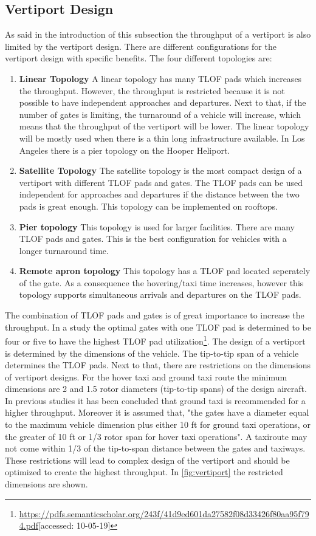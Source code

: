 \subsection{Vertiport Design} \label{subsec:vportDesign}
As said in the introduction of this subsection the throughput of a vertiport is also limited by the vertiport design. There are different configurations for the vertiport design with specific benefits. The four different topologies are:
\begin{enumerate}
    \item \textbf{Linear Topology} A linear topology has many TLOF pads which increases the throughput. However, the throughput is restricted because it is not possible to have independent approaches and departures. Next to that, if the number of gates is limiting, the turnaround of a vehicle will increase, which means that the throughput of the vertiport will be lower. The linear topology will be mostly used when there is a thin long infrastructure available. In Los Angeles there is a pier topology on the Hooper Heliport.
    \item \textbf{Satellite Topology} The satellite topology is the most compact design of a vertiport with different TLOF pads and gates. The TLOF pads can be used independent for approaches and departures if the distance between the two pads is great enough. This topology can be implemented on rooftops.
    \item  \textbf{Pier topology} This topology is used for larger facilities. There are many TLOF pads and gates. This is the best configuration for vehicles with a longer turnaround time.
    \item \textbf{Remote apron topology} This topology has a TLOF pad located seperately of the gate. As a consequence the hovering/taxi time increases, however this topology supports simultaneous arrivals and departures on the TLOF pads.
\end{enumerate}
The combination of TLOF pads and gates is of great importance to increase the throughput. In a study the optimal gates with one TLOF pad is determined to be four or five to have the highest TLOF pad utilization\footnote{\url{https://pdfs.semanticscholar.org/243f/41d9ed601da27582f08d33426f80aa95f794.pdf}[accessed: 10-05-19]}. The design of a vertiport is determined by the dimensions of the vehicle. The tip-to-tip span of a vehicle determines the TLOF pads. Next to that, there are restrictions on the dimensions of vertiport designs. For the hover taxi and ground taxi route the minimum dimensions are 2 and 1.5 rotor diameters (tip-to-tip spans) of the design aircraft. In previous studies it has been concluded that ground taxi is recommended for a higher throughput. Moreover it is assumed that, "the gates have a diameter equal to the maximum vehicle dimension plus either 10 ft for ground taxi operations, or the greater of 10 ft or 1/3 rotor span for hover taxi operations\footnotemark[\value{footnote}]". A taxiroute may not come within 1/3 of the tip-to-span distance between the gates and taxiways. These restrictions will lead to complex design of the vertiport and should be optimized to create the highest throughput. In \autoref{fig:vertiport} the restricted dimensions are shown.

